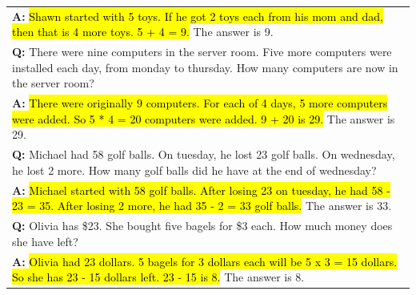 \begin{table}[H]
\begin{tabular}{p{\linewidth}}
        \vspace{-1mm}
        \textbf{A:} \hl{Shawn started with 5 toys. If he got 2 toys each from his mom and dad, then that is 4 more toys. 5 + 4 = 9.} The answer is 9. \\
        \vspace{0mm}
        \textbf{Q:} There were nine computers in the server room. Five more computers were installed each day, from monday to thursday. How many computers are now in the server room? \\
        \vspace{-1mm}
        \textbf{A:} \hl{There were originally 9 computers. For each of 4 days, 5 more computers were added. So 5 * 4 = 20 computers were added. 9 + 20 is 29.} The answer is 29. \\
        \vspace{0mm}
        \textbf{Q:} Michael had 58 golf balls. On tuesday, he lost 23 golf balls. On wednesday, he lost 2 more. How many golf balls did he have at the end of wednesday? \\
        \vspace{-1mm}
        \textbf{A:} \hl{Michael started with 58 golf balls. After losing 23 on tuesday, he had 58 - 23 = 35. After losing 2 more, he had 35 - 2 = 33 golf balls.} The answer is 33. \\
        \vspace{0mm}
        \textbf{Q:} Olivia has \$23. She bought five bagels for \$3 each. How much money does she have left? \\
        \vspace{-1mm}
        \textbf{A:} \hl{Olivia had 23 dollars. 5 bagels for 3 dollars each will be 5 x 3 = 15 dollars. So she has 23 - 15 dollars left. 23 - 15 is 8.} The answer is 8. \\
        \bottomrule
    \end{tabular}
    \label{tab:appendix-mwp-prompts}
\end{table}
\endgroup